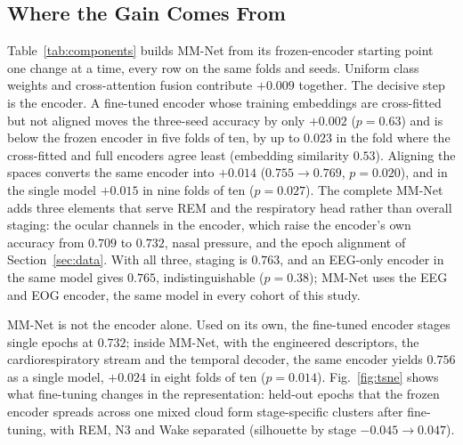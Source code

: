 \documentclass{ieeeaccess}
\begin{document}
\subsection{Where the Gain Comes From}
Table~\ref{tab:components} builds MM-Net from its frozen-encoder starting point one change at a
time, every row on the same folds and seeds. Uniform class weights and cross-attention fusion
contribute $+0.009$ together. The decisive step is the encoder. A fine-tuned encoder whose
training embeddings are cross-fitted but not aligned moves the three-seed accuracy by only
$+0.002$ ($p=0.63$) and is below the frozen encoder in five folds of ten, by up to $0.023$ in
the fold where the cross-fitted and full encoders agree least (embedding similarity $0.53$).
Aligning the spaces
converts the same encoder into $+0.014$ ($0.755\rightarrow0.769$, $p=0.020$), and in the single
model $+0.015$ in nine folds of ten ($p=0.027$). The complete MM-Net adds three elements
that serve REM and the respiratory head rather than overall staging: the ocular channels in the
encoder, which raise the encoder's own accuracy from $0.709$ to $0.732$, nasal pressure, and the
epoch alignment of Section~\ref{sec:data}. With all three, staging is $0.763$, and an EEG-only
encoder in the same model gives $0.765$, indistinguishable ($p=0.38$); MM-Net uses the EEG and EOG
encoder, the same model in every cohort of this study.

MM-Net is not the encoder alone. Used on its own, the fine-tuned encoder stages single epochs at
$0.732$; inside MM-Net, with the engineered descriptors, the cardiorespiratory stream and the
temporal decoder, the same encoder yields $0.756$ as a single model, $+0.024$ in eight folds of
ten ($p=0.014$). Fig.~\ref{fig:tsne} shows what fine-tuning changes in the representation: held-out
epochs that the frozen encoder spreads across one mixed cloud form stage-specific clusters after
fine-tuning, with REM, N3 and Wake separated (silhouette by stage $-0.045\rightarrow0.047$).
\end{document}
